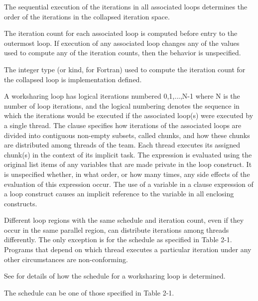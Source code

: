 The sequential execution of the iterations in all 
associated loops determines the order of the iterations in the collapsed iteration space.

The iteration count for each associated loop is computed before entry to the outermost 
loop. If execution of any associated loop changes any of the values used to compute any 
of the iteration counts, then the behavior is unspecified.

The integer type (or kind, for Fortran) used to compute the iteration count for the 
collapsed loop is implementation defined.

A worksharing loop has logical iterations numbered 0,1,...,N-1 where N is the number of 
loop iterations, and the logical numbering denotes the sequence in which the iterations 
would be executed if the associated loop(s) were executed by a single thread. The 
 clause specifies how iterations of the associated loops are divided into 
contiguous non-empty subsets, called chunks, and how these chunks are distributed 
among threads of the team. Each thread executes its assigned chunk(s) in the context of 
its implicit task. The  expression is evaluated using the original list items of 
any variables that are made private in the loop construct. It is unspecified whether, in 
what order, or how many times, any side effects of the evaluation of this expression 
occur. The use of a variable in a  clause expression of a loop construct 
causes an implicit reference to the variable in all enclosing constructs.

Different loop regions with the same schedule and iteration count, even if they occur in 
the same parallel region, can distribute iterations among threads differently. The only 
exception is for the  schedule as specified in Table 2-1. 
Programs that depend 
on which thread executes a particular iteration under any other circumstances are 
non-conforming. 

See  
for details of how the schedule for a worksharing loop is 
determined. 

The schedule  can be one of those specified in Table 2-1.

